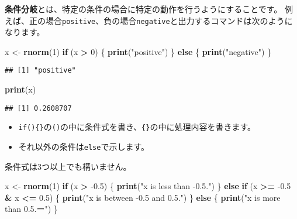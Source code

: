 \documentclass[]{bxjsarticle}
\newenvironment{Shaded}{\begin{snugshade}}{\end{snugshade}}
\newcommand{\ControlFlowTok}[1]{\textcolor[rgb]{0.13,0.29,0.53}{\textbf{#1}}}
\newcommand{\DecValTok}[1]{\textcolor[rgb]{0.00,0.00,0.81}{#1}}
\newcommand{\FloatTok}[1]{\textcolor[rgb]{0.00,0.00,0.81}{#1}}
\newcommand{\KeywordTok}[1]{\textcolor[rgb]{0.13,0.29,0.53}{\textbf{#1}}}
\newcommand{\NormalTok}[1]{#1}
\newcommand{\OperatorTok}[1]{\textcolor[rgb]{0.81,0.36,0.00}{\textbf{#1}}}
\newcommand{\StringTok}[1]{\textcolor[rgb]{0.31,0.60,0.02}{#1}}
\providecommand{\tightlist}{%
  \setlength{\itemsep}{0pt}\setlength{\parskip}{0pt}}
\begin{document}
\textbf{条件分岐}とは、特定の条件の場合に特定の動作を行うようにすることです。
例えば、正の場合\texttt{positive}、負の場合\texttt{negative}と出力するコマンドは次のようになります。

\begin{Shaded}
\begin{Highlighting}[]
\NormalTok{x <-}\StringTok{ }\KeywordTok{rnorm}\NormalTok{(}\DecValTok{1}\NormalTok{)}
\ControlFlowTok{if}\NormalTok{ (x }\OperatorTok{>}\StringTok{ }\DecValTok{0}\NormalTok{) \{}
  \KeywordTok{print}\NormalTok{(}\StringTok{"positive"}\NormalTok{)}
\NormalTok{\} }\ControlFlowTok{else}\NormalTok{ \{}
  \KeywordTok{print}\NormalTok{(}\StringTok{"negative"}\NormalTok{)}
\NormalTok{\}}
\end{Highlighting}
\end{Shaded}

\begin{verbatim}
## [1] "positive"
\end{verbatim}

\begin{Shaded}
\begin{Highlighting}[]
\KeywordTok{print}\NormalTok{(x)}
\end{Highlighting}
\end{Shaded}

\begin{verbatim}
## [1] 0.2608707
\end{verbatim}

\begin{itemize}
\tightlist
\item
  \texttt{if()\{\}}の\texttt{()}の中に条件式を書き、\texttt{\{\}}の中に処理内容を書きます。
\item
  それ以外の条件は\texttt{else}で示します。
\end{itemize}

条件式は3つ以上でも構いません。

\begin{Shaded}
\begin{Highlighting}[]
\NormalTok{x <-}\StringTok{ }\KeywordTok{rnorm}\NormalTok{(}\DecValTok{1}\NormalTok{)}
\ControlFlowTok{if}\NormalTok{ (x }\OperatorTok{>}\StringTok{ }\FloatTok{-0.5}\NormalTok{) \{}
  \KeywordTok{print}\NormalTok{(}\StringTok{"x is less than -0.5."}\NormalTok{)}
\NormalTok{\} }\ControlFlowTok{else} \ControlFlowTok{if}\NormalTok{ (x }\OperatorTok{>=}\StringTok{ }\FloatTok{-0.5} \OperatorTok{&}\StringTok{ }\NormalTok{x }\OperatorTok{<=}\StringTok{ }\FloatTok{0.5}\NormalTok{) \{}
  \KeywordTok{print}\NormalTok{(}\StringTok{"x is between -0.5 and 0.5."}\NormalTok{)}
\NormalTok{\} }\ControlFlowTok{else}\NormalTok{ \{}
  \KeywordTok{print}\NormalTok{(}\StringTok{"x is more than 0.5.ー"}\NormalTok{)}
\NormalTok{\}}
\end{Highlighting}
\end{Shaded}
\end{document}
